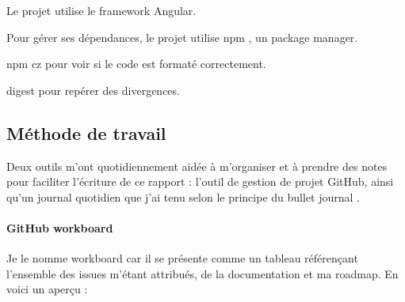\documentclass[12pt]{article}
\begin{document}
Le projet utilise le framework Angular.

Pour gérer ses dépendances, le projet utilise npm \cite{npm}, un package manager.

npm cz pour voir si le code est formaté correctement.

digest pour repérer des divergences.

\subsection{Méthode de travail}
Deux outils m'ont quotidiennement aidée à m'organiser et à prendre des notes pour faciliter l'écriture de ce rapport : l'outil de gestion de projet GitHub, ainsi qu'un journal quotidien que j'ai tenu selon le principe du bullet journal \cite{bullet}.

\paragraph{GitHub workboard}
Je le nomme workboard car il se présente comme un tableau référençant l'ensemble des issues m'étant attribués, de la documentation et ma roadmap. En voici un aperçu :
\end{document}
